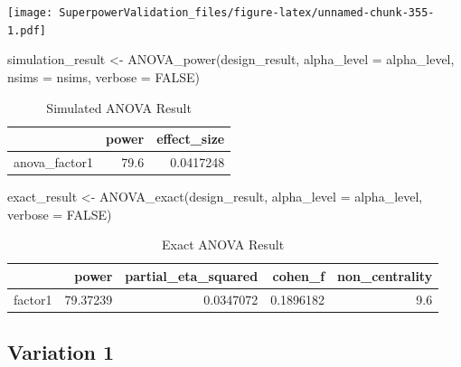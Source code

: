 \documentclass[
]{book}
\newenvironment{Shaded}{\begin{snugshade}}{\end{snugshade}}
\newcommand{\AttributeTok}[1]{\textcolor[rgb]{0.77,0.63,0.00}{#1}}
\newcommand{\ConstantTok}[1]{\textcolor[rgb]{0.00,0.00,0.00}{#1}}
\newcommand{\FunctionTok}[1]{\textcolor[rgb]{0.00,0.00,0.00}{#1}}
\newcommand{\NormalTok}[1]{#1}
\newcommand{\OtherTok}[1]{\textcolor[rgb]{0.56,0.35,0.01}{#1}}
\begin{document}
\texttt{[image: SuperpowerValidation\_files/figure-latex/unnamed-chunk-355-1.pdf]}

\begin{Shaded}
\begin{Highlighting}[]
\NormalTok{simulation\_result }\OtherTok{\textless{}{-}} \FunctionTok{ANOVA\_power}\NormalTok{(design\_result, }
                                 \AttributeTok{alpha\_level =}\NormalTok{ alpha\_level, }
                                 \AttributeTok{nsims =}\NormalTok{ nsims,}
                                 \AttributeTok{verbose =} \ConstantTok{FALSE}\NormalTok{)}
\end{Highlighting}
\end{Shaded}

\begin{table}[!h]

\caption{\label{tab:unnamed-chunk-357}Simulated ANOVA Result}
\centering
\begin{tabular}[t]{l|r|r}
\hline
  & power & effect\_size\\
\hline
anova\_factor1 & 79.6 & 0.0417248\\
\hline
\end{tabular}
\end{table}

\begin{Shaded}
\begin{Highlighting}[]
\NormalTok{exact\_result }\OtherTok{\textless{}{-}} \FunctionTok{ANOVA\_exact}\NormalTok{(design\_result,}
                            \AttributeTok{alpha\_level =}\NormalTok{ alpha\_level,}
                            \AttributeTok{verbose =} \ConstantTok{FALSE}\NormalTok{)}
\end{Highlighting}
\end{Shaded}

\begin{table}[!h]

\caption{\label{tab:unnamed-chunk-359}Exact ANOVA Result}
\centering
\begin{tabular}[t]{l|r|r|r|r}
\hline
  & power & partial\_eta\_squared & cohen\_f & non\_centrality\\
\hline
factor1 & 79.37239 & 0.0347072 & 0.1896182 & 9.6\\
\hline
\end{tabular}
\end{table}

\hypertarget{variation-1}{%
\subsection{Variation 1}\label{variation-1}}
\end{document}
